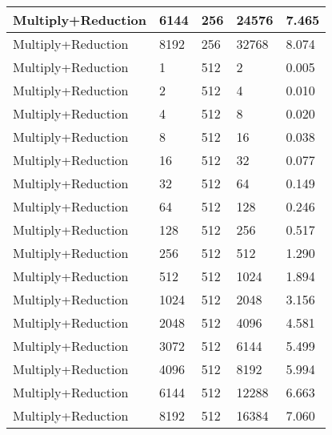\documentclass{article}
\begin{document}
\begin{longtable}{|l|l|l|l|l|}
Multiply+Reduction & 6144 & 256         & 24576             & 7.465             \\ \hline
Multiply+Reduction & 8192 & 256         & 32768             & 8.074             \\ \hline
Multiply+Reduction & 1    & 512         & 2                 & 0.005             \\ \hline
Multiply+Reduction & 2    & 512         & 4                 & 0.010             \\ \hline
Multiply+Reduction & 4    & 512         & 8                 & 0.020             \\ \hline
Multiply+Reduction & 8    & 512         & 16                & 0.038             \\ \hline
Multiply+Reduction & 16   & 512         & 32                & 0.077             \\ \hline
Multiply+Reduction & 32   & 512         & 64                & 0.149             \\ \hline
Multiply+Reduction & 64   & 512         & 128               & 0.246             \\ \hline
Multiply+Reduction & 128  & 512         & 256               & 0.517             \\ \hline
Multiply+Reduction & 256  & 512         & 512               & 1.290             \\ \hline
Multiply+Reduction & 512  & 512         & 1024              & 1.894             \\ \hline
Multiply+Reduction & 1024 & 512         & 2048              & 3.156             \\ \hline
Multiply+Reduction & 2048 & 512         & 4096              & 4.581             \\ \hline
Multiply+Reduction & 3072 & 512         & 6144              & 5.499             \\ \hline
Multiply+Reduction & 4096 & 512         & 8192              & 5.994             \\ \hline
Multiply+Reduction & 6144 & 512         & 12288             & 6.663             \\ \hline
Multiply+Reduction & 8192 & 512         & 16384             & 7.060             \\ \hline
\end{longtable}
\end{document}
